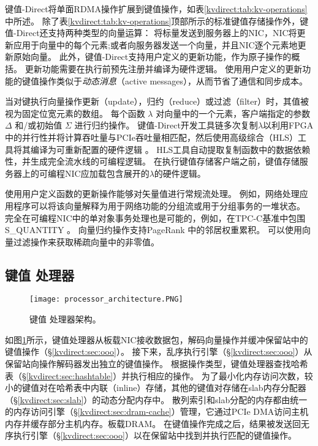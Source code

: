 键值-Direct将单面RDMA操作扩展到键值操作，如表\ref {kvdirect:tab:kv-operations}中所述。
除了表\ref {kvdirect:tab:kv-operations}顶部所示的标准键值存储操作外，键值-Direct还支持两种类型的向量运算：
将标量发送到服务器上的NIC，NIC将更新应用于向量中的每个元素;或者向服务器发送一个向量，并且NIC逐个元素地更新原始向量。
此外，键值-Direct支持用户定义的更新功能，作为原子操作的概括。
更新功能需要在执行前预先注册并编译为硬件逻辑。
使用用户定义的更新功能的键值操作类似于\textit {动态消息}（active messages）\cite {eicken1992active}，从而节省了通信和同步成本。

当对键执行向量操作更新（update），归约（reduce）或过滤（filter）时，其值被视为固定位宽元素的数组。
每个函数 $\lambda$ 对向量中的一个元素，客户端指定的参数 $\Delta$ 和/或初始值 $\Sigma$ 进行归约操作。
键值-Direct开发工具链多次复制$\lambda$以利用FPGA中的并行性并将计算吞吐量与PCIe吞吐量相匹配，然后使用高级综合（HLS）工具将其编译为可重新配置的硬件逻辑\cite {aoc} 。
HLS工具自动提取复制函数中的数据依赖性，并生成完全流水线的可编程逻辑。
在执行键值存储客户端之前，键值存储服务器上的可编程NIC应加载包含展开的$\lambda$的硬件逻辑。

使用用户定义函数的更新操作能够对矢量值进行常规流处理。
例如，网络处理应用程序可以将该向量解释为用于网络功能的分组流\cite{li2016clicknp}或用于分组事务的一堆状态\cite {sivaraman2016packet}。
完全在可编程NIC中的单对象事务处理也是可能的，例如，在TPC-C基准中包围S\_QUANTITY \cite {council2010tpc}。
向量归约操作支持PageRank \cite {page1999pagerank}中的邻居权重累积。
可以使用向量过滤操作来获取稀疏向量中的非零值。

\subsection{键值 处理器}
\label{kvdirect:sec:kv-processor}

\begin{figure}[t]
\centering
\texttt{[image: processor\_architecture.PNG]}
\caption{键值 处理器架构。}
\label{kvdirect:fig:kvprocessor-arch}

\end{figure}

如图\ref {kvdirect:fig:kvprocessor-arch}所示，键值处理器从板载NIC接收数据包，解码向量操作并缓冲保留站中的键值操作（\S \ref {kvdirect:sec:ooo}）。
接下来，乱序执行引擎（\S \ref {kvdirect:sec:ooo}）从保留站向操作解码器发出独立的键值操作。
根据操作类型，键值处理器查找哈希表（\S \ref {kvdirect:sec:hashtable}）并执行相应的操作。
为了最小化内存访问次数，较小的键值对在哈希表中内联（inline）存储，其他的键值对存储在slab内存分配器（\S \ref {kvdirect:sec:slab}）的动态分配内存中。
散列索引和slab分配的内存都由统一的内存访问引擎（\S \ref {kvdirect:sec:dram-cache}）管理，它通过PCIe DMA访问主机内存并缓存部分主机内存。板载DRAM。
在键值操作完成之后，结果被发送回无序执行引擎（\S \ref {kvdirect:sec:ooo}）以在保留站中找到并执行匹配的键值操作。

